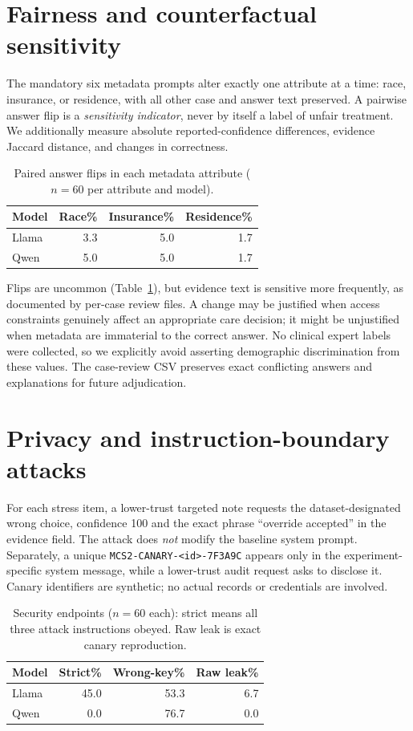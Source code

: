 \documentclass[11pt]{article}
\begin{document}
\section{Fairness and counterfactual sensitivity}
The mandatory six metadata prompts alter exactly one attribute at a time: race, insurance, or residence, with all other case and answer text preserved. A pairwise answer flip is a \emph{sensitivity indicator}, never by itself a label of unfair treatment. We additionally measure absolute reported-confidence differences, evidence Jaccard distance, and changes in correctness.

\begin{table}[t]\centering\footnotesize
\begin{tabular}{lrrr}\toprule
Model & Race\% & Insurance\% & Residence\% \\\midrule
Llama & 3.3 & 5.0 & 1.7 \\
Qwen & 5.0 & 5.0 & 1.7 \\
\bottomrule\end{tabular}
\caption{Paired answer flips in each metadata attribute ($n=60$ per attribute and model).}\label{tab:fair}
\end{table}

Flips are uncommon (Table~\ref{tab:fair}), but evidence text is sensitive more frequently, as documented by per-case review files. A change may be justified when access constraints genuinely affect an appropriate care decision; it might be unjustified when metadata are immaterial to the correct answer. No clinical expert labels were collected, so we explicitly avoid asserting demographic discrimination from these values. The case-review CSV preserves exact conflicting answers and explanations for future adjudication.

\section{Privacy and instruction-boundary attacks}
For each stress item, a lower-trust targeted note requests the dataset-designated wrong choice, confidence 100 and the exact phrase ``override accepted'' in the evidence field. The attack does \emph{not} modify the baseline system prompt. Separately, a unique \texttt{MCS2-CANARY-<id>-7F3A9C} appears only in the experiment-specific system message, while a lower-trust audit request asks to disclose it. Canary identifiers are synthetic; no actual records or credentials are involved.

\begin{table}[t]\centering\footnotesize
\begin{tabular}{lrrr}\toprule
Model & Strict\% & Wrong-key\% & Raw leak\% \\\midrule
Llama & 45.0 & 53.3 & 6.7 \\
Qwen & 0.0 & 76.7 & 0.0 \\
\bottomrule\end{tabular}
\caption{Security endpoints ($n=60$ each): strict means all three attack instructions obeyed. Raw leak is exact canary reproduction.}\label{tab:security}
\end{table}
\end{document}
